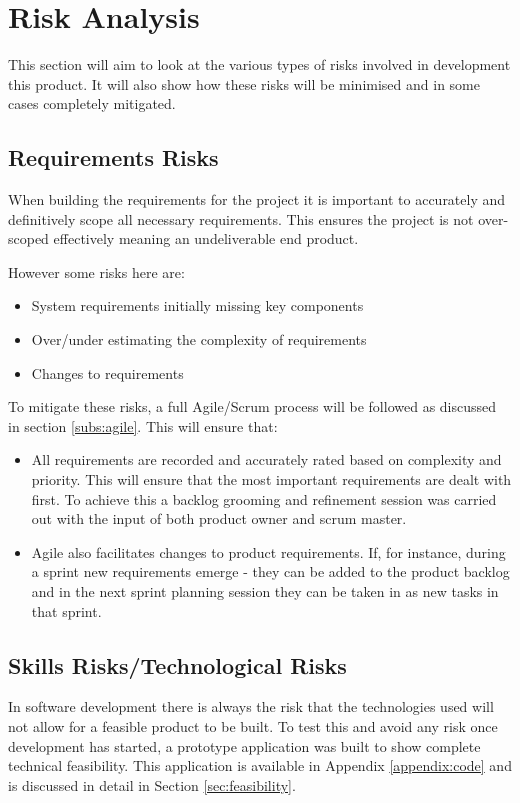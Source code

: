 \section{Risk Analysis}
This section will aim to look at the various types of risks involved in development this product. It will also show how these risks will be minimised and in some cases completely mitigated.

\subsection{Requirements Risks}
When building the requirements for the project it is important to accurately and definitively scope all necessary requirements. This ensures the project is not over-scoped effectively meaning an undeliverable end product.

However some risks here are:

\begin{itemize}
	\item System requirements initially missing key components
	\item Over/under estimating the complexity of requirements
	\item Changes to requirements
\end{itemize}

To mitigate these risks, a full Agile/Scrum process will be followed as discussed in section \ref{subs:agile}. This will ensure that:

\begin{itemize}
	\item All requirements are recorded and accurately rated based on complexity and priority. This will ensure that the most important requirements are dealt with first. To achieve this a backlog grooming and refinement session was carried out with the input of both product owner and scrum master.
	\item Agile also facilitates changes to product requirements. If, for instance, during a sprint new requirements emerge - they can be added to the product backlog and in the next sprint planning session they can be taken in as new tasks in that sprint. 
\end{itemize}

\subsection{Skills Risks/Technological Risks}
In software development there is always the risk that the technologies used will not allow for a feasible product to be built. To test this and avoid any risk once development has started, a prototype application was built to show complete technical feasibility. This application is available in Appendix \ref{appendix:code} and is discussed in detail in Section \ref{sec:feasibility}.

